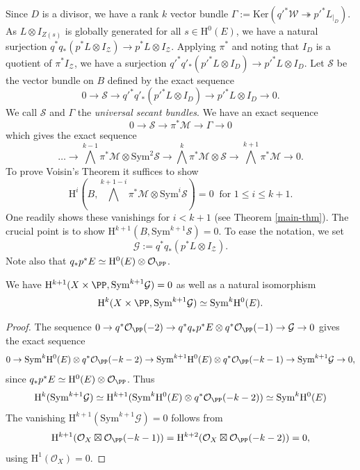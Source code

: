 Since $D$ is a divisor, we have a rank $k$ vector bundle
${\Gamma:=\text{Ker}\left({q'}^*\mathcal{W} \twoheadrightarrow {p'}^*L_{|_D} \right).}$
As $L \otimes I_{Z(s)}$ is globally generated for all $s \in \mathrm{H}^0(E)$, we have a natural surjection ${q}^* q_* ({p}^*L \otimes I_{\mathcal{Z}}) \to {p}^*L \otimes I_{\mathcal{Z}}$. Applying $\pi^*$ and noting that $I_D$ is a quotient of $\pi^*I_{\mathcal{Z}}$, we have a surjection ${q'}^* q'_* ({p'}^*L \otimes I_D) \to {p'}^*L \otimes I_D$.
Let $\mathcal{S}$ be the vector bundle on $B$ defined by the exact sequence
$$0 \to \mathcal{S} \to {q'}^* q'_* ({p'}^*L \otimes I_D) \to {p'}^*L \otimes I_D \to 0.$$
We call $\mathcal{S}$ and $\Gamma$ the \emph{universal secant bundles}.
We have an exact sequence $$0 \to \mathcal{S} \to \pi^* \mathcal{M} \to \Gamma \to 0$$ which gives the exact sequence
$$ \ldots \to \bigwedge^{k-1} \pi^* \mathcal{M} \otimes \mathrm{Sym}^2 \mathcal{S} \to  \bigwedge^{k} \pi^* \mathcal{M} \otimes \mathcal{S} \to \bigwedge^{k+1}\pi^* \mathcal{M} \to 0.$$
To prove Voisin's Theorem it suffices to show $$\mathrm{H}^i(B, \bigwedge^{k+1-i} \pi^* \mathcal{M} \otimes \mathrm{Sym}^i \mathcal{S})=0 \; \; \text{for $1 \leq i \leq k+1$}.$$
One readily shows these vanishings for $i <k+1$ (see Theorem \ref{main-thm}). The crucial point is to show $\mathrm{H}^{k+1}(B, \mathrm{Sym}^{k+1} \mathcal{S})=0$. To ease the notation, we set $$\mathcal{G}:=q^*q_*(p^*L \otimes I_{\mathcal{Z}}).$$ Note also that $q_*p^*E \simeq \mathrm{H}^0(E) \otimes \mathcal{O}_{\PP}$.
\begin{lem}
\notready \label{first-iso}
We have $\mathrm{H}^{k+1}(X \times \PP,\mathrm{Sym}^{k+1} \mathcal{G})=0$ as well as a natural isomorphism
$$\mathrm{H}^k(X \times \PP,\mathrm{Sym}^{k+1} \mathcal{G})\simeq \mathrm{Sym}^k \mathrm{H}^0(E).$$
\end{lem}
\begin{proof}
The sequence $0 \to q^*\mathcal{O}_{\PP}(-2) \to q^*q_*p^*E \otimes q^*\mathcal{O}_{\PP}(-1) \to \mathcal{G}\to 0$
 gives the exact sequence
$$0 \to \mathrm{Sym}^k \mathrm{H}^0(E) \otimes q^*\mathcal{O}_{\PP}(-k-2) \to \mathrm{Sym}^{k+1}\mathrm{H}^0(E) \otimes q^*\mathcal{O}_{\PP}(-k-1) \to \mathrm{Sym}^{k+1}\mathcal{G} \to 0,$$
since $q_*p^*E \simeq \mathrm{H}^0(E) \otimes \mathcal{O}_{\PP}$. Thus
\begin{align*}
\mathrm{H}^k(\mathrm{Sym}^{k+1}\mathcal{G}) \simeq \mathrm{H}^{k+1}(\mathrm{Sym}^k \mathrm{H}^0(E) \otimes q^*\mathcal{O}_{\PP}(-k-2))\simeq \mathrm{Sym}^k \mathrm{H}^0(E)
\end{align*}
The vanishing $\mathrm{H}^{k+1}(\mathrm{Sym}^{k+1} \mathcal{G})=0$ follows from $$\mathrm{H}^{k+1}(\mathcal{O}_X \boxtimes \mathcal{O}_{\PP}(-k-1))=\mathrm{H}^{k+2}(\mathcal{O}_X \boxtimes \mathcal{O}_{\PP}(-k-2))=0,$$
using $\mathrm{H}^1(\mathcal{O}_X)=0$.
\end{proof}

